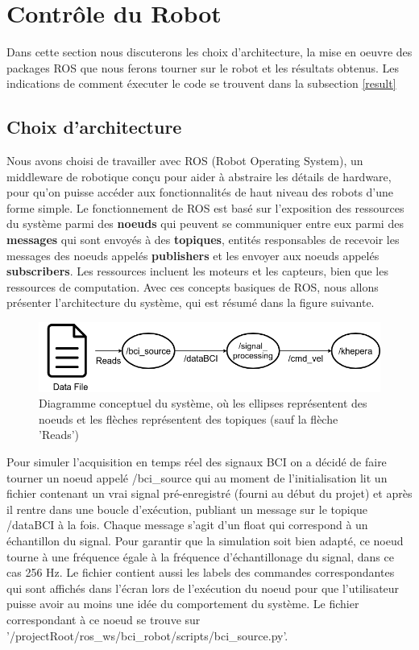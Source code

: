 
\section{Contrôle du Robot} 

Dans cette section nous discuterons les choix d'architecture, la mise en oeuvre des packages ROS que nous ferons tourner sur le robot et les résultats obtenus. Les indications de comment éxecuter le code se trouvent dans la subsection \ref{result}

\subsection{Choix d'architecture}

Nous avons choisi de travailler avec ROS (Robot Operating System), un middleware de robotique conçu pour aider à abstraire les détails de hardware, pour qu'on puisse accéder aux fonctionnalités de haut niveau des robots d'une forme simple. Le fonctionnement de ROS est basé sur l'exposition des ressources du système parmi des \textbf{noeuds} qui peuvent se communiquer entre eux parmi des \textbf{messages} qui sont envoyés à des \textbf{topiques}, entités responsables de recevoir les messages des noeuds appelés \textbf{publishers} et les envoyer aux noeuds appelés \textbf{subscribers}. Les ressources incluent les moteurs et les capteurs, bien que les ressources de computation. Avec ces concepts basiques de ROS, nous allons présenter l'architecture du système, qui est résumé dans la figure suivante.

\begin{figure}[!h]
  \centering
	\includegraphics[scale=0.40]{images/ArchiDiagram.png}
	\caption{Diagramme conceptuel du système, où les ellipses représentent des noeuds et les flèches représentent des topiques (sauf la flèche 'Reads')}
	\label{fig:archDiag}
\end{figure}


Pour simuler l'acquisition en temps réel des signaux BCI on a décidé de faire tourner un noeud appelé /bci\_source qui au moment de l'initialisation lit un fichier contenant un vrai signal pré-enregistré (fourni au début du projet) et après il rentre dans une boucle d'exécution, publiant un message sur le topique /dataBCI à la fois. Chaque message s'agit d'un float qui correspond à un échantillon du signal. Pour garantir que la simulation soit bien adapté, ce noeud tourne à une fréquence égale à la fréquence d'échantillonage du signal, dans ce cas 256 Hz. Le fichier contient aussi les labels des commandes correspondantes qui sont affichés dans l'écran lors de l'exécution du noeud pour que l'utilisateur puisse avoir au moins une idée du comportement du système. Le fichier correspondant à ce noeud se trouve sur '/projectRoot/ros\_ws/bci\_robot/scripts/bci\_source.py'.

